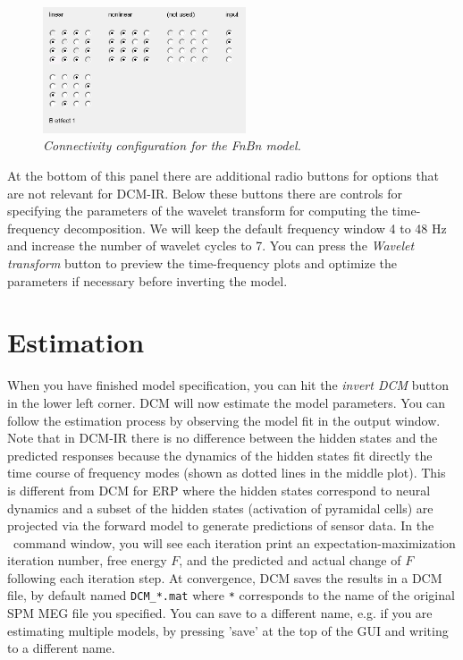 \begin{figure}
\begin{center}
\includegraphics[width=60mm]{dcm_ir/figures/irfigure4}
\caption{\em Connectivity configuration for the FnBn model.\label{dcm-ir:fig:4}}
\end{center}
\end{figure}

At the bottom of this panel there are additional radio buttons for options that are not relevant for DCM-IR. Below these buttons there are controls for specifying the parameters of the wavelet transform for computing the time-frequency decomposition. We will keep the default frequency window 4 to 48 Hz and increase the number of wavelet cycles to 7. You can press the \textit{Wavelet transform} button to preview the time-frequency plots and optimize the parameters if necessary before inverting the model.  


\section{Estimation}
When you have finished model specification, you can hit the \textit{invert DCM} button in the lower left corner. DCM will now estimate the model parameters. You can follow the estimation process by observing the model fit in the output window. Note that in DCM-IR there is no difference between the hidden states and the predicted responses because the dynamics of the hidden states fit directly the time course of frequency modes (shown as dotted lines in the middle plot). This is different from DCM for ERP where the hidden states correspond to neural dynamics and a subset of the hidden states (activation of pyramidal cells) are projected via the forward model to generate predictions of sensor data. In the \matlab\ command window, you will see each iteration print an expectation-maximization iteration number, free energy $F$, and the predicted and actual change of $F$ following each iteration step. At convergence, DCM saves the results in a DCM file, by default named \texttt{DCM\_*.mat} where \texttt{*} corresponds to the name of the original SPM MEG file you specified. You can save to a different name, e.g. if you are estimating multiple models, by pressing 'save' at the top of the GUI and writing to a different name.

